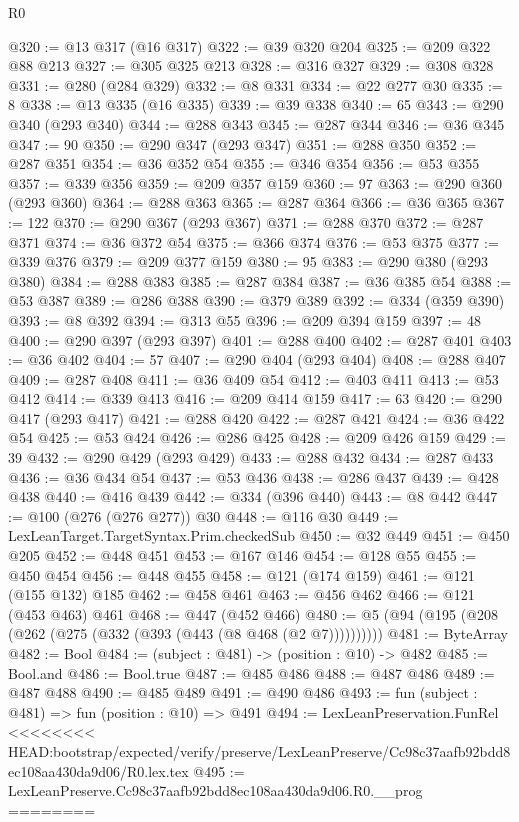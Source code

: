 \begin{lexlean}{R0}
\begin{coremodule}
{{{{{{{{{{{{{{{{{{{@320 := @13 @317 (@16 @317)
@322 := @39 @320 @204
@325 := @209 @322 @88 @213
@327 := @305 @325 @213
@328 := @316 @327
@329 := @308 @328
@331 := @280 (@284 @329)
@332 := @8 @331
@334 := @22 @277 @30
@335 := 8
@338 := @13 @335 (@16 @335)
@339 := @39 @338
@340 := 65
@343 := @290 @340 (@293 @340)
@344 := @288 @343
@345 := @287 @344
@346 := @36 @345
@347 := 90
@350 := @290 @347 (@293 @347)
@351 := @288 @350
@352 := @287 @351
@354 := @36 @352 @54
@355 := @346 @354
@356 := @53 @355
@357 := @339 @356
@359 := @209 @357 @159
@360 := 97
@363 := @290 @360 (@293 @360)
@364 := @288 @363
@365 := @287 @364
@366 := @36 @365
@367 := 122
@370 := @290 @367 (@293 @367)
@371 := @288 @370
@372 := @287 @371
@374 := @36 @372 @54
@375 := @366 @374
@376 := @53 @375
@377 := @339 @376
@379 := @209 @377 @159
@380 := 95
@383 := @290 @380 (@293 @380)
@384 := @288 @383
@385 := @287 @384
@387 := @36 @385 @54
@388 := @53 @387
@389 := @286 @388
@390 := @379 @389
@392 := @334 (@359 @390)
@393 := @8 @392
@394 := @313 @55
@396 := @209 @394 @159
@397 := 48
@400 := @290 @397 (@293 @397)
@401 := @288 @400
@402 := @287 @401
@403 := @36 @402
@404 := 57
@407 := @290 @404 (@293 @404)
@408 := @288 @407
@409 := @287 @408
@411 := @36 @409 @54
@412 := @403 @411
@413 := @53 @412
@414 := @339 @413
@416 := @209 @414 @159
@417 := 63
@420 := @290 @417 (@293 @417)
@421 := @288 @420
@422 := @287 @421
@424 := @36 @422 @54
@425 := @53 @424
@426 := @286 @425
@428 := @209 @426 @159
@429 := 39
@432 := @290 @429 (@293 @429)
@433 := @288 @432
@434 := @287 @433
@436 := @36 @434 @54
@437 := @53 @436
@438 := @286 @437
@439 := @428 @438
@440 := @416 @439
@442 := @334 (@396 @440)
@443 := @8 @442
@447 := @100 (@276 (@276 @277)) @30
@448 := @116 @30
@449 := LexLeanTarget.TargetSyntax.Prim.checkedSub
@450 := @32 @449
@451 := @450 @205
@452 := @448 @451
@453 := @167 @146
@454 := @128 @55
@455 := @450 @454
@456 := @448 @455
@458 := @121 (@174 @159)
@461 := @121 (@155 @132) @185
@462 := @458 @461
@463 := @456 @462
@466 := @121 (@453 @463) @461
@468 := @447 (@452 @466)
@480 := @5 (@94 (@195 (@208 (@262 (@275 (@332 (@393 (@443 (@8 @468 (@2 @7))))))))))
@481 := ByteArray
@482 := Bool
@484 := (subject : @481) -> (position : @10) -> @482
@485 := Bool.and
@486 := Bool.true
@487 := @485 @486
@488 := @487 @486
@489 := @487 @488
@490 := @485 @489
@491 := @490 @486
@493 := fun (subject : @481) => fun (position : @10) => @491
@494 := LexLeanPreservation.FunRel
<<<<<<<< HEAD:bootstrap/expected/verify/preserve/LexLeanPreserve/Cc98c37aafb92bdd8ec108aa430da9d06/R0.lex.tex
@495 := LexLeanPreserve.Cc98c37aafb92bdd8ec108aa430da9d06.R0.__prog
========
}}}}}}}}}}}}}}}}}}}
\end{coremodule}
\end{lexlean}
